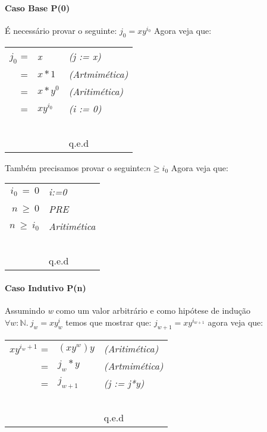 \paragraph{Caso Base P(0)}
É necessário provar o seguinte: $ j_0 =xy^{i_0} $ Agora veja que:
 \begin{center}
     \begin{tabular}{rll}
         \emph{$j_0$} =& \emph{x} & \emph{(j := x)} \\
                      =& \emph{$x*1$}& \emph{(Artmimética)}\\ 
                      =& \emph{$x*y^0$}& \emph{(Aritimética)}\\        
                      =& \emph{$xy^{i_0}$}& \emph{(i := 0)}\\ 
         ~&~&~\\
         ~&~&q.e.d\\
     \end{tabular}
 \end{center}
Também precisamos provar o seguinte:$n \geq i_0$ Agora veja que:
 \begin{center}
     \begin{tabular}{rl}
         \emph{$i_0\ =\ 0$}& \emph{i:=0} \\
         \emph{$n\ \geq\ 0$}& \emph{PRE} \\
         \emph{$n\ \geq\ i_0$}& \emph{Aritimética} \\
         ~&~\\
         ~&q.e.d\\
     \end{tabular}
 \end{center}

\paragraph{Caso Indutivo P(n)}
Assumindo \emph{w} como um valor arbitrário e como hipótese de indução
$\forall w :\mathbb{N} .\ j_w=xy^i_w$ temos que mostrar que: 
$j_{w+1}=xy^{i_{w+1}}$ agora veja que:
 \begin{center}
     \begin{tabular}{rll}
         \emph{$xy^{i_w+1}$} =& \emph{$(xy^w)y$} & \emph{(Aritimética)} \\
                                  =& \emph{$j_w*y$}& \emph{(Artmimética)}\\ 
                                  =& \emph{$j_{w+1}$}& \emph{(j := j*y)}\\        
         ~&~&~\\
         ~&~&q.e.d\\
     \end{tabular}
 \end{center}

